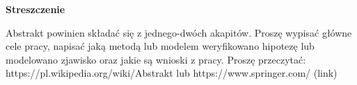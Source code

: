 \vspace*{6\baselineskip}
\begin{center}
\textbf{Streszczenie}
\end{center}
Abstrakt powinien składać się z jednego-dwóch akapitów. Proszę wypisać główne cele pracy, napisać jaką metodą lub modelem weryfikowano hipotezę lub modelowano zjawisko oraz jakie są wnioski z pracy. Proszę przeczytać: https://pl.wikipedia.org/wiki/Abstrakt lub https://www.springer.com/ (link)
\vspace{4\baselineskip}

\newpage
